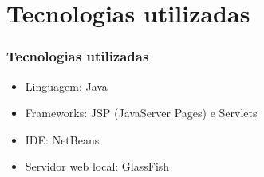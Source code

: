 \section{Tecnologias utilizadas}

\begin{frame}
\frametitle{Tecnologias utilizadas}
	\begin{itemize}
		\item Linguagem: Java
		\item Frameworks: JSP (JavaServer Pages) e Servlets
		\item IDE: NetBeans
		\item Servidor web local: GlassFish
	\end{itemize}
\end{frame}